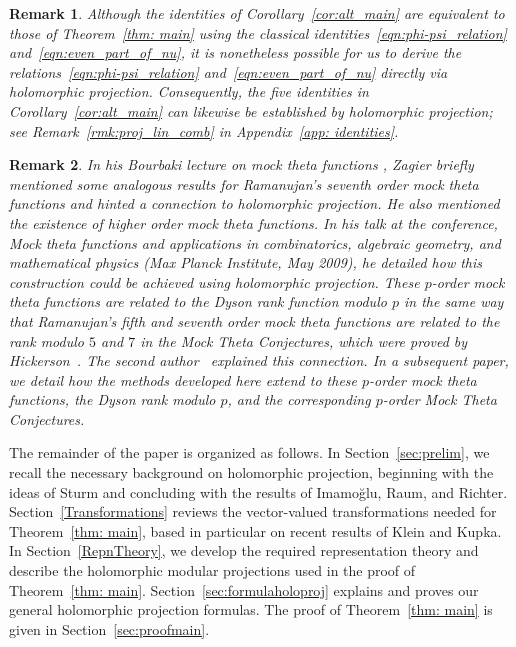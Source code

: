 \documentclass[11pt,reqno]{amsart}
\renewcommand{\=}{\;=\;}
\theoremstyle{myremark}
\newtheorem{remark}{Remark}
\begin{document}
\begin{remark}
Although the identities of Corollary~\ref{cor:alt_main} are equivalent to those of Theorem~\ref{thm: main} using the classical identities~\eqref{eqn:phi-psi_relation} and~\eqref{eqn:even_part_of_nu}, it is nonetheless possible for us to derive the relations~\eqref{eqn:phi-psi_relation} and~\eqref{eqn:even_part_of_nu} directly via holomorphic projection. 
Consequently, the five identities in Corollary~\ref{cor:alt_main} can likewise be established by holomorphic projection; see Remark~\ref{rmk:proj_lin_comb} in Appendix~\ref{app: identities}.
\end{remark}

\begin{remark}
In his Bourbaki lecture on mock theta functions \cite[p.986-15]{Zagier2009}, Zagier briefly mentioned some analogous results for Ramanujan's seventh order mock theta functions and hinted a connection to holomorphic projection. 
He also mentioned the existence of higher order mock theta functions. 
In his talk at the conference, \textit{Mock theta functions and applications in combinatorics, algebraic geometry, and mathematical physics} (Max Planck Institute, May 2009), he detailed how this construction could be achieved using holomorphic projection.
These $p$-order mock theta functions are related to the Dyson rank function modulo $p$ in the same way that Ramanujan's fifth and seventh order mock theta functions are related to the rank modulo $5$ and $7$ in the Mock Theta Conjectures, which were proved by Hickerson~\cite{Hickerson1988a,Hickerson1988b}. 
The second author~\cite{FG} explained this connection. 
In a subsequent paper, we detail how the methods developed here extend to these $p$-order mock theta functions, the Dyson rank modulo $p$, and the corresponding $p$-order Mock Theta Conjectures.
\end{remark}

The remainder of the paper is organized as follows. 
In Section~\ref{sec:prelim}, we recall the necessary background on holomorphic projection, beginning with the ideas of Sturm and concluding with the results of Imamo\u{g}lu, Raum, and Richter. 
Section~\ref{Transformations} reviews the vector-valued transformations needed for Theorem~\ref{thm: main}, based in particular on recent results of Klein and Kupka. 
In Section~\ref{RepnTheory}, we develop the required representation theory and describe the holomorphic modular projections used in the proof of Theorem~\ref{thm: main}.
Section~\ref{sec:formulaholoproj} explains and proves our general holomorphic projection formulas.
The proof of Theorem~\ref{thm: main} is given in Section~\ref{sec:proofmain}. 
\end{document}
